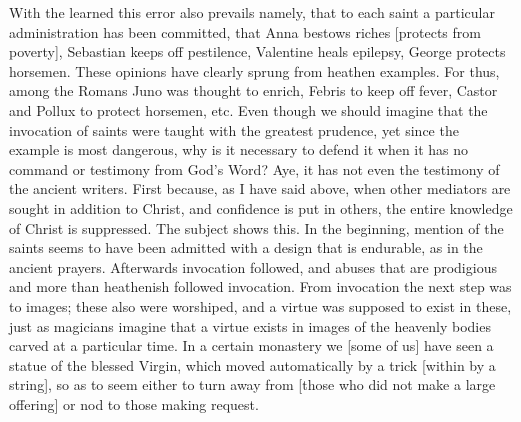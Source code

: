 With the learned this error also prevails namely, that to each saint
a particular administration has been committed, that Anna bestows
riches [protects from poverty], Sebastian keeps off pestilence,
Valentine heals epilepsy, George protects horsemen.  These opinions
have clearly sprung from heathen examples.  For thus, among the
Romans Juno was thought to enrich, Febris to keep off fever, Castor
and Pollux to protect horsemen, etc. Even though we should imagine
that the invocation of saints were taught with the greatest prudence,
yet since the example is most dangerous, why is it necessary to
defend it when it has no command or testimony from God's Word?  Aye,
it has not even the testimony of the ancient writers.  First because,
as I have said above, when other mediators are sought in addition to
Christ, and confidence is put in others, the entire knowledge of
Christ is suppressed.  The subject shows this.  In the beginning,
mention of the saints seems to have been admitted with a design that
is endurable, as in the ancient prayers.  Afterwards invocation
followed, and abuses that are prodigious and more than heathenish
followed invocation.  From invocation the next step was to images;
these also were worshiped, and a virtue was supposed to exist in
these, just as magicians imagine that a virtue exists in images of
the heavenly bodies carved at a particular time.  In a certain
monastery we [some of us] have seen a statue of the blessed Virgin,
which moved automatically by a trick [within by a string], so as to
seem either to turn away from [those who did not make a large
offering] or nod to those making request.

